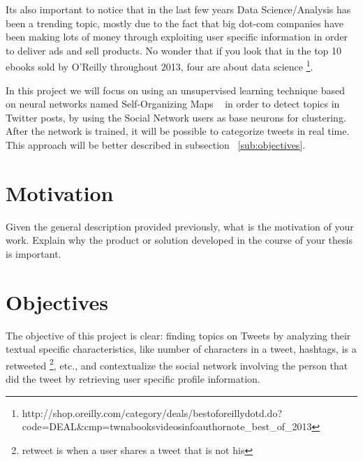 Its also important to notice that in the last few years Data Science/Analysis has been a trending topic, mostly due to the fact that big dot-com companies have been making lots of money through exploiting user specific information in order to deliver ads and sell products. No wonder that if you look that in the top 10 ebooks sold by O'Reilly throughout 2013, four are about data science \footnote{http://shop.oreilly.com/category/deals/best\-of\-oreilly\-dotd.do?code=DEAL\&cmp=tw\-na\-books\-videos\-info\-authornote\_best\_of\_2013}.

In this project we will focus on using an unsupervised learning technique based on neural networks named Self-Organizing Maps ~\cite{Kohonen1990} in order to detect topics in Twitter posts, by using the Social Network users as base neurons for clustering. After the network is trained, it will be possible to categorize tweets in real time. This approach will be better described in subsection ~\ref{sub:objectives}.

 

\section{Motivation}

Given the general description provided previously, what is the motivation of your work. Explain why the product or solution developed in the course of your thesis is important.

\section{Objectives}

The objective of this project is clear: finding topics on Tweets by analyzing their textual specific characteristics, like number of characters in a tweet, hashtags, is a retweeted \footnote{retweet is when a user shares a tweet that is not his}, etc., and contextualize the social network involving the person that did the tweet by retrieving user specific profile information.

